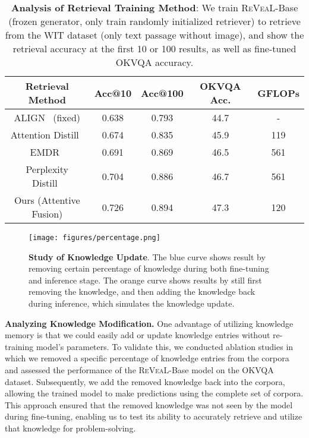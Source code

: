 \documentclass[10pt,twocolumn,letterpaper]{article}
\newcommand{\method}{R\textsc{e}V\textsc{ea}L\xspace}
\begin{document}
{ \setlength\tabcolsep{2pt} 
\begin{table}[t!]
\centering
\footnotesize
\begin{tabular}{c|cc|c|c} \toprule
\textbf{Retrieval Method} & \textbf{Acc@10} & \textbf{Acc@100} & \textbf{OKVQA Acc.} & \textbf{GFLOPs} \\ \midrule
ALIGN~\cite{DBLP:conf/icml/JiaYXCPPLSLD21} (fixed) & 0.638 & 0.793 & 44.7 & -\\ \midrule
Attention Distill~\cite{izacard2020distilling} & 0.674 & 0.835 & 45.9 & 119\\
EMDR~\cite{DBLP:conf/naacl/YangXLLTXLL19} & 0.691 & 0.869 & 46.5 & 561\\ 
Perplexity Distill~\cite{DBLP:journals/corr/abs-2208-03299} & 0.704 & 0.886 & 46.7 & 561 \\ \midrule
Ours (Attentive Fusion) & 0.726 & 0.894 & 47.3 & 120 \\
\bottomrule
\end{tabular}
\vspace{-.1in}
\caption{\textbf{Analysis of Retrieval Training Method}: We train \method-Base (frozen generator, only train randomly initialized retriever) to retrieve from the WIT dataset (only text passage without image), and show the retrieval accuracy at the first 10 or 100 results, as well as fine-tuned OKVQA accuracy.}
\label{tab:signal}
\end{table}
}  

\begin{figure}[t!]
    \centering
    \texttt{[image: figures/percentage.png]}
    \vspace{-.1in}
    \caption{\textbf{Study of Knowledge Update}. The blue curve shows result by removing certain percentage of knowledge during both fine-tuning and inference stage. The orange curve shows results by still first removing the knowledge, and then adding the knowledge back during inference, which simulates the knowledge update.}
    \label{fig:update}
\end{figure}




\textbf{Analyzing Knowledge Modification.}
One advantage of utilizing knowledge memory is that we could easily add or update knowledge entries without re-training model's parameters. To validate this, we conducted ablation studies in which we removed a specific percentage of knowledge entries from the corpora and assessed the performance of the \method-Base model on the OKVQA dataset. Subsequently, we add the removed knowledge back into the corpora, allowing the trained model to make predictions using the complete set of corpora. This approach ensured that the removed knowledge was not seen by the model during fine-tuning, enabling us to test its ability to accurately retrieve and utilize that knowledge for problem-solving.
\end{document}
